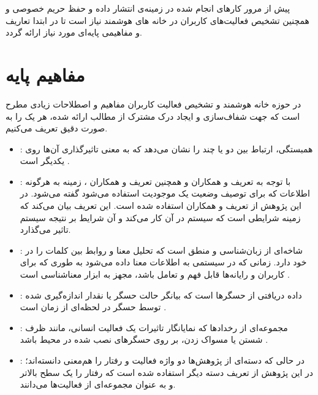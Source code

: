 
پیش از مرور کارهای انجام شده در زمینه‌ی انتشار داده و حفظ حریم خصوصی و همچنین تشخیص فعالیت‌های کاربران در خانه های هوشمند نیاز است تا در ابتدا تعاریف و مفاهیمی پایه‌ای مورد نیاز ارائه گردد.

\section{مفاهیم پایه}

در حوزه خانه هوشمند و تشخیص فعالیت کاربران مفاهیم و اصطلاحات زیادی مطرح است که جهت شفاف‌سازی و ایجاد درک مشترک از مطالب ارائه شده، هر یک را به صورت دقیق تعریف می‌کنیم.

\begin{itemize}
\item \textbf{}: همبستگی، ارتباط بین دو یا چند  را نشان می‌دهد که به معنی تاثیرگذاری آن‌ها روی یکدیگر است \cite{x211}.
\item \textbf{}: با توجه به تعریف  و همکاران \cite{x212} و همچنین تعریف  و همکاران \cite{x213}، زمینه به هرگونه اطلاعات که برای توصیف وضعیت یک موجودیت استفاده می‌شود گفته می‌شود. در این پژوهش از تعریف  و همکاران \cite{x2147777} استفاده شده است. این تعریف بیان می‌کند که زمینه شرایطی است که سیستم در آن کار می‌کند و آن شرایط بر نتیجه سیستم تاثیر می‌گذارد.
\item \textbf{}: شاخه‌ای از زبان‌شناسی و منطق است که تحلیل معنا و روابط بین کلمات را در خود دارد. زمانی که در سیستمی به اطلاعات معنا داده می‌شود به طوری که برای کاربران و رایانه‌ها قابل فهم و تعامل باشد، مجهز به ابزار معناشناسی است \cite{x213}.
\item \textbf{}: داده دریافتی از حسگرها است که بیانگر حالت حسگر یا نقدار اندازه‌گیری شده توسط حسگر در لحظه‌ای از زمان است \cite{x3228}. 
\item \textbf{}: مجموعه‌ای از رخدادها که نمایانگار تاثیرات یک فعالیت انسانی، مانند ظرف شستن یا مسواک زدن، بر روی حسگرهای نصب شده در محیط باشد \cite{xyz1}. 
\item \textbf{}: در حالی که دسته‌ای از پژوهش‌ها \cite{x3212, xyz2, xyz3} دو واژه فعالیت و رفتار را هم‌معنی دانسته‌اند؛ در این پژوهش از تعریف دسته دیگر \cite{xyz4, xyz5} استفاده شده است که رفتار را یک سطح بالاتر و به عنوان مجموعه‌ای از فعالیت‌ها می‌دانند.
\end{itemize}

